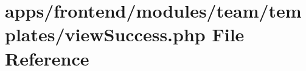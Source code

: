 \hypertarget{frontend_2modules_2team_2templates_2view_success_8php}{\section{apps/frontend/modules/team/templates/view\-Success.php File Reference}
\label{frontend_2modules_2team_2templates_2view_success_8php}
}
